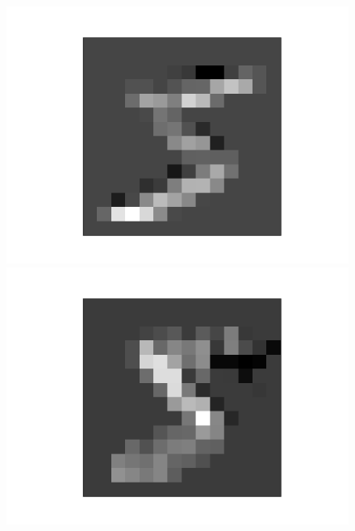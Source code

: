 \documentclass[11pt]{article}
\begin{document}
\begin{figure}[h]
\begin{minipage}{0.2\linewidth}
	\includegraphics[width=\linewidth]{../graphics/mnist_5/conv_pool/upper_horiz_pooled.png}
\end{minipage}
\hfill
\begin{minipage}{0.2\linewidth}
	\centering
	\includegraphics[width=\linewidth]{../graphics/mnist_5/conv_pool/left_vert_pooled.png}
\end{minipage}
\hfill
\begin{minipage}{0.2\linewidth}
	\centering

\end{minipage}
\end{figure}
\end{document}
